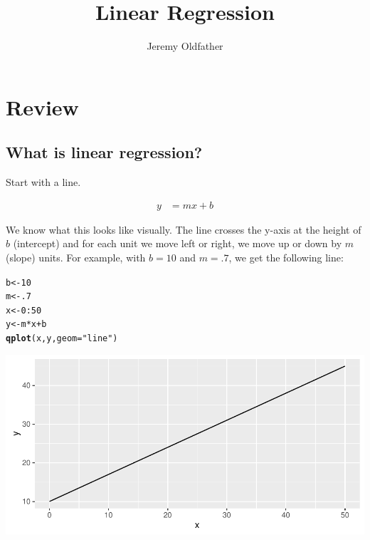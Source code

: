 \documentclass[10pt]{article}\usepackage[]{graphicx}\usepackage[]{color}
\makeatletter
\def\maxwidth{ %
  \ifdim\Gin@nat@width>\linewidth
    \linewidth
  \else
    \Gin@nat@width
  \fi
}
\newcommand{\hlnum}[1]{\textcolor[rgb]{0.686,0.059,0.569}{#1}}%
\newcommand{\hlstr}[1]{\textcolor[rgb]{0.192,0.494,0.8}{#1}}%
\newcommand{\hlopt}[1]{\textcolor[rgb]{0,0,0}{#1}}%
\newcommand{\hlstd}[1]{\textcolor[rgb]{0.345,0.345,0.345}{#1}}%
\newcommand{\hlkwb}[1]{\textcolor[rgb]{0.69,0.353,0.396}{#1}}%
\newcommand{\hlkwc}[1]{\textcolor[rgb]{0.333,0.667,0.333}{#1}}%
\newcommand{\hlkwd}[1]{\textcolor[rgb]{0.737,0.353,0.396}{\textbf{#1}}}%
\newenvironment{kframe}{%
 \def\at@end@of@kframe{}%
 \ifinner\ifhmode%
  \def\at@end@of@kframe{\end{minipage}}%
  \begin{minipage}{\columnwidth}%
 \fi\fi%
 \def\FrameCommand##1{\hskip\@totalleftmargin \hskip-\fboxsep
 \colorbox{shadecolor}{##1}\hskip-\fboxsep
     \hskip-\linewidth \hskip-\@totalleftmargin \hskip\columnwidth}%
 \MakeFramed {\advance\hsize-\width
   \@totalleftmargin\z@ \linewidth\hsize
   \@setminipage}}%
 {\par\unskip\endMakeFramed%
 \at@end@of@kframe}
\newenvironment{knitrout}{}{} %
\makeatother
\begin{document}
\title{Linear Regression}
\author{Jeremy Oldfather}
\maketitle



\section*{Review}

\subsection*{What is linear regression?}

Start with a line.

\begin{align}
y &= mx + b \label{line}
\end{align}


We know what this looks like visually. The line crosses the y-axis at the height of $b$ (intercept) and for each unit we move left or right, we move up or down by $m$ (slope) units. For example, with $b=10$ and $m=.7$, we get the following line:

\begin{knitrout}\small
{}\color{fgcolor}\begin{kframe}
\begin{alltt}
\hlstd{b}\hlkwb{<-}\hlnum{10}
\hlstd{m}\hlkwb{<-}\hlnum{.7}
\hlstd{x}\hlkwb{<-}\hlnum{0}\hlopt{:}\hlnum{50}
\hlstd{y}\hlkwb{<-}\hlstd{m}\hlopt{*}\hlstd{x} \hlopt{+} \hlstd{b}
\hlkwd{qplot}\hlstd{(x,y,}\hlkwc{geom}\hlstd{=}\hlstr{"line"}\hlstd{)}
\end{alltt}
\end{kframe}

{\centering \includegraphics[width=\maxwidth]{figure/simple_line-1} 

}



\end{knitrout}
\end{document}
